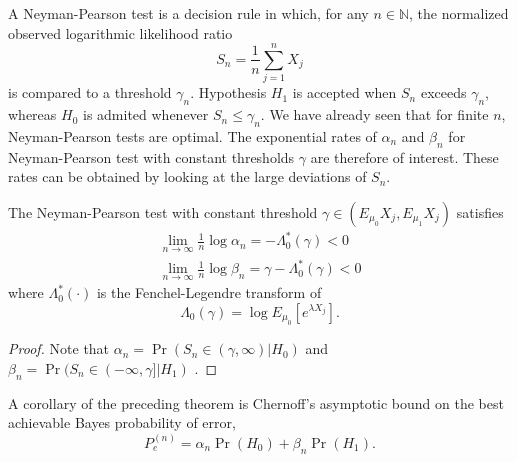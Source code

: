 A Neyman-Pearson test is a decision rule in which, for any $n \in \mathbb{N}$, the normalized observed logarithmic likelihood ratio
\begin{equation*}
S_n = \frac{1}{n} \sum_{j=1}^n X_j
\end{equation*}
is compared to a threshold $\gamma_n$.
Hypothesis $H_1$ is accepted when $S_n$ exceeds $\gamma_n$, whereas $H_0$ is admited whenever $S_n \leq \gamma_n$.
We have already seen that for finite $n$, Neyman-Pearson tests are optimal.
The exponential rates of $\alpha_n$ and $\beta_n$ for Neyman-Pearson test with constant thresholds $\gamma$ are therefore of interest.
These rates can be obtained by looking at the large deviations of $S_n$.

\begin{theorem} \label{theorem:AsymptoticHypothesisTesting}
The Neyman-Pearson test with constant threshold $\gamma \in (E_{\mu_0} X_j, E_{\mu_1} X_j)$ satisfies
\begin{align*}
\lim_{n \rightarrow \infty} \frac{1}{n} \log \alpha_n = - \Lambda_0^* (\gamma) < 0 \\
\lim_{n \rightarrow \infty} \frac{1}{n} \log \beta_n = \gamma - \Lambda_0^* (\gamma) < 0
\end{align*}
where $\Lambda_0^* (\cdot)$ is the Fenchel-Legendre transform of
\begin{equation*}
\Lambda_0 (\gamma) = \log E_{\mu_0} \left[ e^{\lambda X_j} \right] .
\end{equation*}
\end{theorem}

\begin{proof}
Note that $\alpha_n = \Pr (S_n \in (\gamma, \infty) | H_0)$ and $\beta_n = \Pr (S_n \in (-\infty, \gamma] | H_1)$ .
\end{proof}

A corollary of the preceding theorem is Chernoff's asymptotic bound on the best achievable Bayes probability of error,
\begin{equation*}
P_e^{(n)} = \alpha_n \Pr (H_0) + \beta_n \Pr (H_1) .
\end{equation*}

